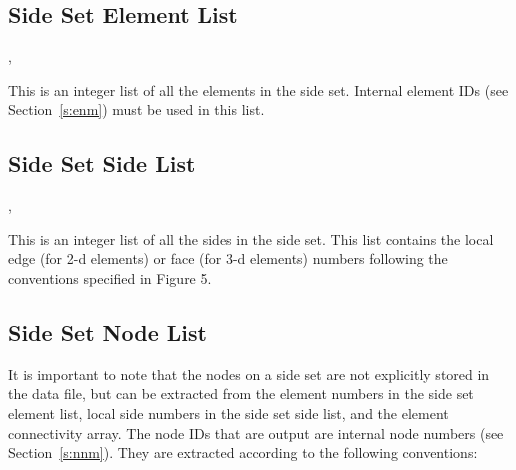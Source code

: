 \subsection{Side Set Element List}



\begin{spacing}{1.5}
\api {}, 
\end{spacing}

{This is an integer list of all the elements in the side set.
Internal element IDs (see  Section~\ref{s:enm}) must be used
in this list.}



\subsection{Side Set Side List}



\begin{spacing}{1.5}
\api {}, 
\end{spacing}

{This is an integer list of all the sides in the side set.
This list contains the local edge (for 2-d elements) or face
(for 3-d elements) numbers following the conventions specified
in  Figure 5.}



\subsection{Side Set Node List}



\begin{spacing}{1.5}
\api {}
\end{spacing}

It is important to note that the nodes on a side set are
not explicitly stored in the data file, but can be extracted
from the element numbers in the side set element list, local
side numbers in the side set side list, and the element connectivity
array. The node IDs that are output are internal node numbers
(see  Section~\ref{s:nnm}). They are extracted according to
the following conventions:


